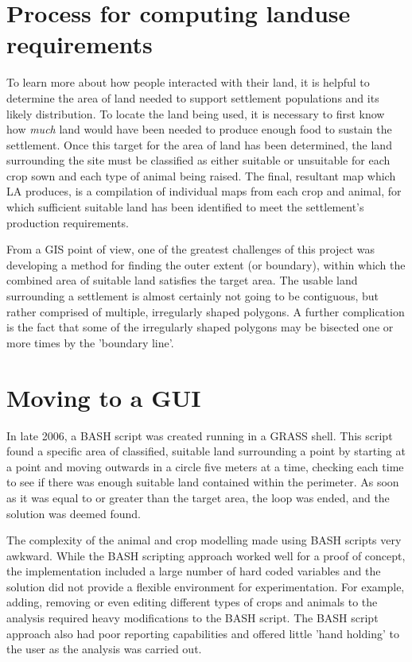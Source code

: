 \section{Process for computing landuse requirements} 

\label{sec:EarlyAttempts} 

To learn more about how people interacted with their land, it is
helpful to determine the area of land needed to support settlement
populations and its likely distribution.  To locate the land being used, it is
necessary
to first know how \textit{much} land would have been needed to produce enough
food to
sustain the settlement.  Once this target for the area of land has been
determined, the land surrounding the site must be classified as either suitable
or unsuitable for each crop sown and each type of animal being raised.  The
final, resultant map which LA produces, is a compilation of individual maps from
each crop and animal, for which sufficient suitable land has been identified to
meet the settlement's production requirements.

From a GIS point of view, one of the greatest challenges of this project was
developing a method for finding the outer extent (or boundary), within which
the combined area of suitable land satisfies the target area.  The usable land
surrounding a settlement is almost certainly not going to be contiguous, but
rather comprised of multiple, irregularly shaped polygons. A further
complication is the fact that some of the irregularly shaped polygons may
be bisected one or more times by the 'boundary line'.


\section{Moving to a GUI} \label{GUI} 

In late 2006, a BASH script was created running in a GRASS shell. This script
found a specific area of classified, suitable land surrounding a point by
starting at a point and moving outwards in a circle five meters at a time,
checking each time to see if there was enough suitable land contained within the
perimeter. As soon as it was equal to or greater than the target area, the loop
was ended, and the solution was deemed found.
 
The complexity of the animal and crop modelling made using BASH scripts very
awkward.  While the BASH scripting approach worked well for a proof of concept,
the implementation included a large number of hard coded variables and the
solution did not provide a flexible environment for experimentation. For
example, adding, removing or even editing different types of crops and animals
to the analysis required heavy modifications to the BASH script.  The BASH
script approach also had poor reporting capabilities and offered
little 'hand holding' to the user as the analysis was carried out.

